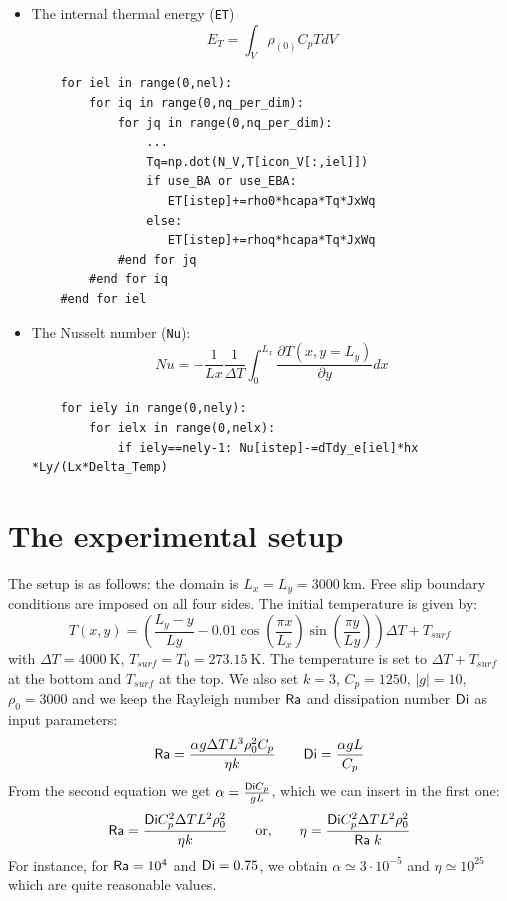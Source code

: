 \begin{itemize}
\begin{lstlisting}
                rhoq=np.dot(N_V,rho[icon_V[:,iel]])
                EG[istep]+=rhoq*gy*yq*JxWq
            #end for jq
        #end for iq
    #end for iel
\end{lstlisting}
\item The internal thermal energy (\lstinline{ET})
\[
E_T = \int_V \rho_{(0)} C_p T dV
\]
\begin{lstlisting}
    for iel in range(0,nel):
        for iq in range(0,nq_per_dim):
            for jq in range(0,nq_per_dim):
                ...
                Tq=np.dot(N_V,T[icon_V[:,iel]])
                if use_BA or use_EBA:
                   ET[istep]+=rho0*hcapa*Tq*JxWq
                else:
                   ET[istep]+=rhoq*hcapa*Tq*JxWq
            #end for jq
        #end for iq
    #end for iel
\end{lstlisting}

\item The Nusselt number (\lstinline{Nu}):
\[
Nu=-\frac{1}{Lx}\frac{1}{\Delta T} \int_0^{L_x} \frac{\partial T(x,y=L_y)}{\partial y} dx
\]
\begin{lstlisting}
    for iely in range(0,nely):
        for ielx in range(0,nelx):
            if iely==nely-1: Nu[istep]-=dTdy_e[iel]*hx *Ly/(Lx*Delta_Temp)
\end{lstlisting}
\end{itemize}



\section*{The experimental setup}

The setup is as follows: the domain is $L_x=L_y=3000~\si{\kilo\meter}$. 
Free slip boundary conditions are imposed on all four sides. 
The initial temperature is given by:
\[
T(x,y)=\left( \frac{L_y-y}{Ly} -0.01\cos(\frac{\pi x}{L_x}) \sin(\frac{\pi y}{Ly}) \right) \Delta T + T_{surf}
\]
with $\Delta T=4000~\si{\kelvin}$, $T_{surf}=T_0=273.15~\si{\kelvin}$. 
The temperature is set to $\Delta T + T_{surf}$ at the bottom and $T_{surf}$ at the top.
We also set $k=3$, $C_p=1250$, $|g|=10$, $\rho_0=3000$ and we keep the Rayleigh number 
${\mathsf{Ra}}$ and dissipation number ${\mathsf{Di}}$ as input parameters:
\[
{\mathsf{Ra}}=\frac{\alpha g \Delta T L^3 \rho_0^2 C_p}{\eta k}
\quad\quad
{\mathsf{Di}}=\frac{\alpha g L}{C_p}
\]
From the second equation we get $\alpha=\frac{{\mathsf{Di}} C_p}{g L}$, which we can insert in the first one:
\[
{\mathsf{Ra}}=\frac{{\mathsf{Di}} C_p^2 \Delta T L^2 \rho_0^2 }{\eta k}
\quad\quad
{\rm or,}
\quad\quad
\eta=
\frac{{\mathsf{Di}} C_p^2 \Delta T L^2 \rho_0^2 }{{\mathsf{Ra}} \; k  }
\]
For instance, for ${\mathsf{Ra}}=10^4$ and ${\mathsf{Di}}=0.75$, 
we obtain $\alpha\simeq 3\cdot 10^{-5}$ and $\eta\simeq 10^{25}$ 
which are quite reasonable values. 


